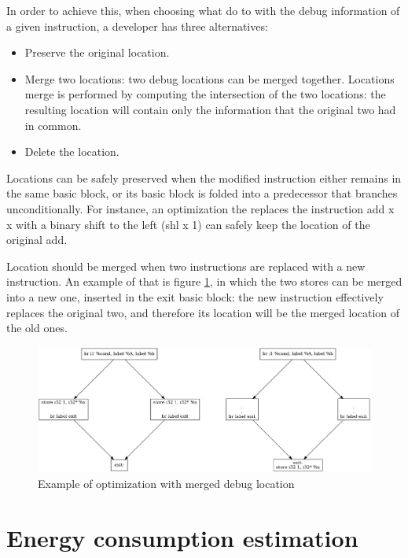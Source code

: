 In order to achieve this, when choosing what do to with the debug information of a given instruction, a developer has three alternatives:
\begin{itemize}
\item Preserve the original location.
\item Merge two locations: two debug locations can be merged together. Locations merge is performed by computing the intersection of the two locations: the resulting location will contain only the information that the original two had in common.
\item Delete the location.
\end{itemize}
Locations can be safely preserved when the modified instruction either remains in the same basic block, or its basic block is folded into a predecessor that branches unconditionally. For instance, an optimization the replaces the instruction {\selectfont add x x} with a binary shift to the left ({\selectfont shl x 1}) can safely keep the location of the original add. \par 
Location should be merged when two instructions are replaced with a new instruction. An example of that is figure \ref{fig:merge}, in which the two stores can be merged into a new one, inserted in the exit basic block: the new instruction effectively replaces the original two, and therefore its location will be the merged location of the old ones. \par
\begin{figure}
\centering
\includegraphics[scale=0.3]{chapter-2/merge.png}
\caption{Example of optimization with merged debug location}
\label{fig:merge}
\end{figure}

\section{Energy consumption estimation}

